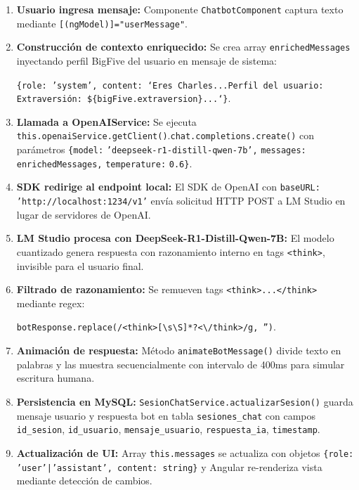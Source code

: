 \documentclass[12pt,a4paper]{report}
\numberwithin{figure}{section}
\begin{document}
\begin{enumerate}
  \item \textbf{Usuario ingresa mensaje:} Componente \texttt{ChatbotComponent} captura texto mediante \texttt{[(ngModel)]="userMessage"}.
  
  \item \textbf{Construcción de contexto enriquecido:} Se crea array \texttt{enrichedMessages} inyectando perfil BigFive del usuario en mensaje de sistema: 
  
  \texttt{\{role: 'system', content: `Eres Charles...Perfil del usuario: Extraversión: \$\{bigFive.extraversion\}...`\}}.
  
  \item \textbf{Llamada a OpenAIService:} Se ejecuta \texttt{this.openaiService.getClient()}.\allowbreak\texttt{chat.completions.create()} con parámetros \texttt{\{model:} \texttt{'deepseek-r1-distill-qwen-7b',} \texttt{messages:} \texttt{enrichedMessages,} \texttt{temperature:} \texttt{0.6\}}.
  
  \item \textbf{SDK redirige al endpoint local:} El SDK de OpenAI con \texttt{baseURL: 'http:\slash\slash localhost:1234\slash v1'} envía solicitud HTTP POST a LM Studio en lugar de servidores de OpenAI.
  
  \item \textbf{LM Studio procesa con DeepSeek-R1-Distill-Qwen-7B:} El modelo cuantizado genera respuesta con razonamiento interno en tags \texttt{<think>}, invisible para el usuario final.
  
  \item \textbf{Filtrado de razonamiento:} Se remueven tags \texttt{<think>...</think>} mediante regex: 
  
  \texttt{botResponse.replace(/<think>[\textbackslash s\textbackslash S]*?<\textbackslash /think>/g, '')}.
  
  \item \textbf{Animación de respuesta:} Método \texttt{animateBotMessage()} divide texto en palabras y las muestra secuencialmente con intervalo de 400ms para simular escritura humana.
  
  \item \textbf{Persistencia en MySQL:} \texttt{SesionChatService.actualizarSesion()} guarda mensaje usuario y respuesta bot en tabla \texttt{sesiones\_chat} con campos \texttt{id\_sesion}, \texttt{id\_usuario}, \texttt{mensaje\_usuario}, \texttt{respuesta\_ia}, \texttt{timestamp}.
  
  \item \textbf{Actualización de UI:} Array \texttt{this.messages} se actualiza con objetos \texttt{\{role: 'user'|'assistant', content: string\}} y Angular re-renderiza vista mediante detección de cambios.
\end{enumerate}
\end{document}
